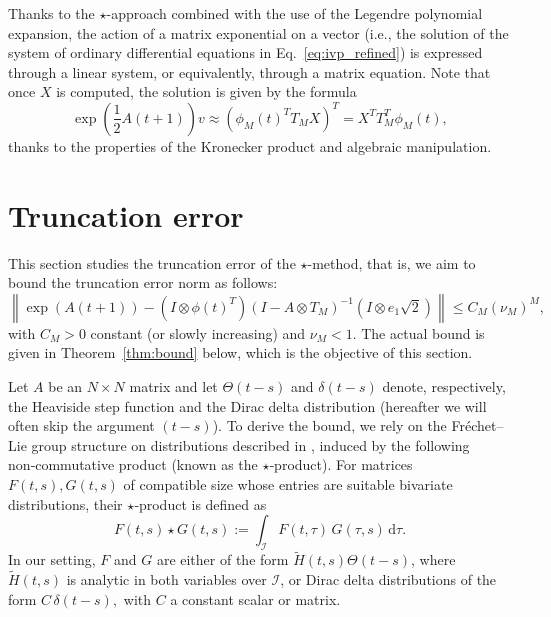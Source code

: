 \documentclass[final,1p,times,number]{elsarticle}
\theoremstyle{plain}%
\begin{document}
Thanks to the $\star$-approach combined with the use of the Legendre polynomial expansion, the action of a matrix exponential on a vector (i.e., the solution of the system of ordinary differential equations in Eq.~\eqref{eq:ivp_refined}) is expressed through a linear system, or equivalently, through a matrix equation.
Note that once $X$ is computed, the solution is given by the formula
\[ \exp\left(\frac{1}{2}A(t+1)\right)v \approx \left(\phi_M(t)^T T_M X\right)^T =  X^T T_M^T \phi_M(t), \]
thanks to the properties of the Kronecker product and algebraic manipulation.

\section{Truncation error}\label{sec:trunc:err}
This section studies the truncation error of the $\star$-method, that is, we aim to bound the truncation error norm as follows:
\[ \left\| \exp(A(t+1)) - (I \otimes \phi(t)^T)(I-A \otimes T_{M})^{-1}(I \otimes e_1 \sqrt{2})  \right\| \leq C_M \left(\nu_M\right)^M,  \]
with $C_M>0$ constant (or slowly increasing) and $\nu_M<1$. The actual bound is given in Theorem~\ref{thm:bound} below, which is the objective of this section.

  Let $A$ be an $N \times N$ matrix and let $\Theta(t-s)$ and $\delta(t-s)$ denote, respectively, the Heaviside step function and the Dirac delta distribution (hereafter we will often skip the argument \((t-s)\)). 
To derive the bound, we rely on the Fréchet–Lie group structure on distributions described in \cite{RycBouGis25}, induced by the following non‑commutative product (known as the $\star$‑product).
For matrices \(F(t,s), G(t,s)\) of compatible size whose entries are suitable bivariate distributions, their $\star$‑product is defined as
\begin{equation}\label{eq:starproddef}
    F(t,s) \star G(t,s) := \int_{\mathcal{I}} F(t,\tau)\, G(\tau,s) \,\mathrm{d}\tau.
\end{equation}
In our setting, \(F\) and \(G\) are either of the form \(\tilde{H}(t,s)\Theta(t-s)\), where \(\tilde{H}(t,s)\) is analytic in both variables over \(\mathcal{I}\), or Dirac delta distributions of the form  
\(
  C\,\delta(t-s),
\)
with \(C\) a constant scalar or matrix.
\end{document}
